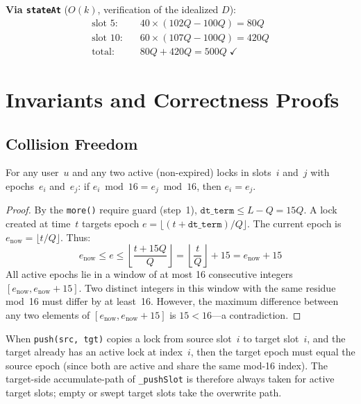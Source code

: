 \documentclass[10pt,a4paper,twocolumn]{article}
\begin{document}
\textbf{Via \texttt{stateAt}} ($O(k)$, verification of the idealized $D$):
\begin{align*}
\text{slot 5:}\quad & 40 \times (102Q - 100Q) = 80Q \\
\text{slot 10:}\quad & 60 \times (107Q - 100Q) = 420Q \\
\text{total:}\quad & 80Q + 420Q = 500Q \;\checkmark
\end{align*}

\section{Invariants and Correctness Proofs}
\label{sec:proofs}

\subsection{Collision Freedom}

\begin{theorem}
\label{thm:collision}
For any user~$u$ and any two active (non-expired) locks in slots~$i$ and~$j$ with epochs~$e_i$ and~$e_j$: if $e_i \bmod 16 = e_j \bmod 16$, then $e_i = e_j$.
\end{theorem}

\begin{proof}
By the \texttt{more()} require guard (step~1), $\texttt{dt\_term} \leq L - Q = 15Q$. A lock created at time~$t$ targets epoch $e = \lfloor(t{+}\texttt{dt\_term})/Q\rfloor$. The current epoch is $e_{\text{now}} = \lfloor t/Q \rfloor$. Thus:
\[
e_{\text{now}} \leq e \leq \left\lfloor \frac{t + 15Q}{Q} \right\rfloor = \left\lfloor \frac{t}{Q} \right\rfloor + 15 = e_{\text{now}} + 15
\]
All active epochs lie in a window of at most 16 consecutive integers $[e_{\text{now}}, e_{\text{now}}{+}15]$. Two distinct integers in this window with the same residue mod~16 must differ by at least~16. However, the maximum difference between any two elements of $[e_{\text{now}}, e_{\text{now}}{+}15]$ is $15 < 16$---a contradiction.
\end{proof}

\begin{corollary}
\label{cor:cross-user}
When \texttt{push(src, tgt)} copies a lock from source slot~$i$ to target slot~$i$, and the target already has an active lock at index~$i$, then the target epoch must equal the source epoch (since both are active and share the same mod-16 index). The target-side accumulate-path of \texttt{\_pushSlot} is therefore always taken for active target slots; empty or swept target slots take the overwrite path.
\end{corollary}
\end{document}
